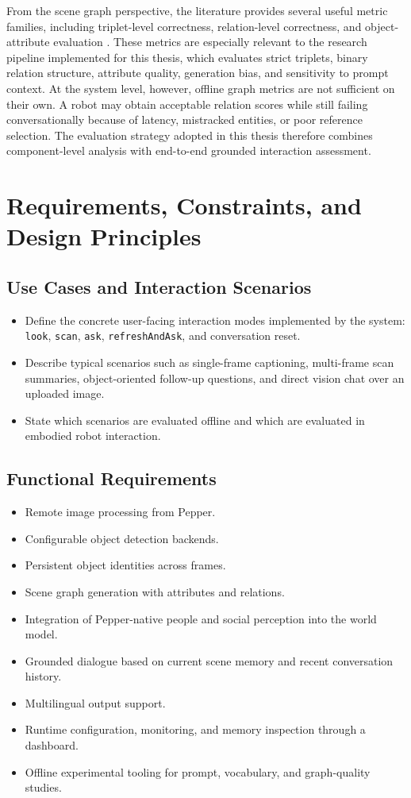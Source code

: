 \documentclass[
  digital,     %
  oneside,     %
  nosansbold,  %
  nocolorbold, %
  lof,         %
  lot,         %
]{fithesis4}
\begin{document}
From the scene graph perspective, the literature provides several useful metric families, including triplet-level correctness, relation-level correctness, and object-attribute evaluation \cite{zhu_scene_2022}. These metrics are especially relevant to the research pipeline implemented for this thesis, which evaluates strict triplets, binary relation structure, attribute quality, generation bias, and sensitivity to prompt context. At the system level, however, offline graph metrics are not sufficient on their own. A robot may obtain acceptable relation scores while still failing conversationally because of latency, mistracked entities, or poor reference selection. The evaluation strategy adopted in this thesis therefore combines component-level analysis with end-to-end grounded interaction assessment.

\chapter{Requirements, Constraints, and Design Principles}

\section{Use Cases and Interaction Scenarios}
\begin{itemize}
    \item Define the concrete user-facing interaction modes implemented by the system: \texttt{look}, \texttt{scan}, \texttt{ask}, \texttt{refreshAndAsk}, and conversation reset.
    \item Describe typical scenarios such as single-frame captioning, multi-frame scan summaries, object-oriented follow-up questions, and direct vision chat over an uploaded image.
    \item State which scenarios are evaluated offline and which are evaluated in embodied robot interaction.
\end{itemize}

\section{Functional Requirements}
\begin{itemize}
    \item Remote image processing from Pepper.
    \item Configurable object detection backends.
    \item Persistent object identities across frames.
    \item Scene graph generation with attributes and relations.
    \item Integration of Pepper-native people and social perception into the world model.
    \item Grounded dialogue based on current scene memory and recent conversation history.
    \item Multilingual output support.
    \item Runtime configuration, monitoring, and memory inspection through a dashboard.
    \item Offline experimental tooling for prompt, vocabulary, and graph-quality studies.
\end{itemize}
\end{document}
